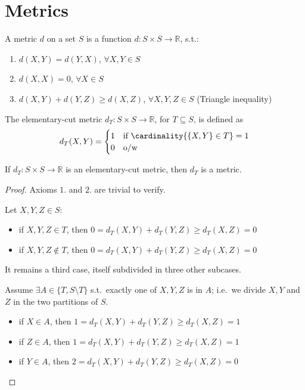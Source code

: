 \section{Metrics}

    \begin{definition}[Metric]
        A metric $d$ on a set $S$ is a function $d : S \times S \rightarrow \mathbb{R}$, s.t.:
        \begin{enumerate}
            \item $d(X,Y) = d(Y,X)$, $\forall X,Y \in S$
            \item $d(X,X) = 0$, $\forall X \in S$
            \item $d(X,Y) + d(Y,Z) \geq d(X,Z)$, $\forall X,Y,Z \in S$ (Triangle inequality)
        \end{enumerate}
    \end{definition}

    \begin{definition}
        The elementary-cut metric $d_T : S \times S \rightarrow \mathbb{R}$, for $T \subseteq S$, is defined as
        \begin{equation}
            d_T(X,Y) = 
            \begin{cases}
                1 & \text{if } \cardinality{\{X,Y\} \in T } = 1\\
                0 & \text{o/w}
            \end{cases}
        \end{equation}
    \end{definition}

    \begin{lemma}
        If $d_T : S \times S \rightarrow \mathbb{R}$ is an elementary-cut metric, then $d_T$ is a metric.
    \end{lemma}

    \begin{proof}
        Axioms $1.$ and $2.$ are trivial to verify.

        Let $X,Y,Z \in S$:
        \begin{itemize}
            \item if $X,Y,Z \in T$, then $0 = d_T(X,Y) + d_T(Y,Z) \geq d_T(X,Z) = 0$
            \item if $X,Y,Z \not\in T$, then $0 = d_T(X,Y) + d_T(Y,Z) \geq d_T(X,Z) = 0$
        \end{itemize}

        It remains a third case, itself subdivided in three other subcases.

        Assume $\exists A \in \{ T, S \setminus T \}$ s.t.~exactly one of $X,Y,Z$ is in $A$; i.e.~we divide $X,Y$ and $Z$ in the two partitions of $S$.
        \begin{itemize}
            \item if $X \in A$, then $1 = d_T(X,Y) + d_T(Y,Z) \geq d_T(X,Z) = 1$
            \item if $Z \in A$, then $1 = d_T(X,Y) + d_T(Y,Z) \geq d_T(X,Z) = 1$
            \item if $Y \in A$, then $2 = d_T(X,Y) + d_T(Y,Z) \geq d_T(X,Z) = 0$
        \end{itemize}
    \end{proof}

